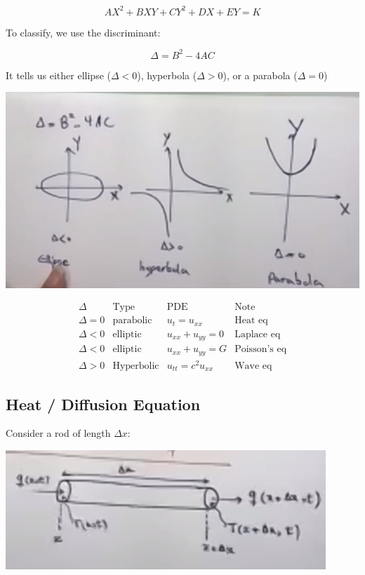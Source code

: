 \documentclass{article}
\begin{document}
$$AX^2 + BXY + CY^2 + DX + EY = K$$

To classify, we use the discriminant:

$$\Delta = B^2 - 4AC$$

It tells us either ellipse ($\Delta < 0$), hyperbola ($\Delta > 0$), or a parabola ($\Delta = 0$)

\includegraphics[width = 0.9 \textwidth]{image2.png}

$$\begin{matrix} 
\Delta & \text{Type} & \text{PDE} & \text{Note} \\ 
\Delta = 0 & \text{parabolic} & u_t = u_{xx} & \text{Heat eq} \\ 
\Delta < 0 & \text{elliptic} & u_{xx} + u_{yy} = 0 & \text{Laplace eq} \\
\Delta < 0 & \text{elliptic} & u_{xx} + u_{yy} = G & \text{Poisson's eq} \\
\Delta > 0 & \text{Hyperbolic} & u_{tt} = c^2 u_{xx} & \text{Wave eq}
\end{matrix}$$

\hfill

\subsection{Heat / Diffusion Equation}

Consider a rod of length $\Delta x$:

\includegraphics[width = 0.9 \textwidth]{image3.png}
\end{document}
